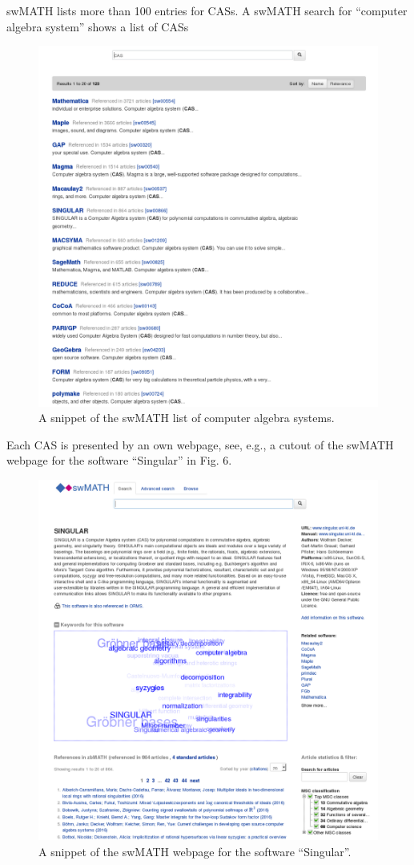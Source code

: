 \documentclass[12pt]{article}
\begin{document}
swMATH lists more than 100 entries for CASs. A swMATH search for ``computer
algebra system'' shows a list of CASs
\begin{figure}[h]
  \centering \includegraphics[scale=0.2]{aca5}
  \caption{A snippet of the swMATH list of computer algebra
    systems.\label{abb_5}}
\end{figure}

Each CAS is presented by an own webpage, see, e.g., a cutout of the swMATH
webpage for the software ``Singular'' in Fig. 6.
\begin{figure}[h]
  \centering
  \includegraphics[scale=0.2]{aca6}
  \caption{A snippet of the swMATH webpage for the software
    ``Singular''.\label{abb_6}}
\end{figure}
\end{document}
